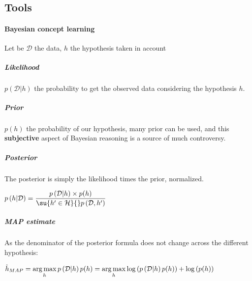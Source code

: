 \subsection{Tools}

\paragraph{Bayesian concept learning}
Let be $\mathcal{D}$ the data, $h$ the hypothesis taken in account
\subparagraph{Likelihood}
$p\left(\mathcal{D}|h\right)$ the probability to get the observed data considering the 
hypothesis $h$.
\subparagraph{Prior}
$p(h)$ the probability of our hypothesis, many prior can be used, and this 
\textbf{subjective} aspect of Bayesian reasoning is a source of much controversy.

\subparagraph{Posterior}
The posterior is simply the likelihood times the prior, normalized.
\begin{center}
$p\left(h|\mathcal{D}\right) = \dfrac{p\left(\mathcal{D}|h\right)\times p(h)}{
    \su{h'\in\mathcal{H}}{}p\left(\mathcal{D}, h'\right)
}$
\end{center}
\subparagraph{MAP estimate}
As the denominator of the posterior formula does not change across the different 
hypothesis:
\begin{center}
    $\hat{h}_{MAP} = \displaystyle\operatorname*{arg\,max}_{h} p\left(\mathcal{D}|h\right)p(h) = 
    \displaystyle\operatorname*{arg\,max}_{h} \log\left(p\left(\mathcal{D}|h\right)p(h)\right) + \log\left(
       p(h)\right)
    $
\end{center}



